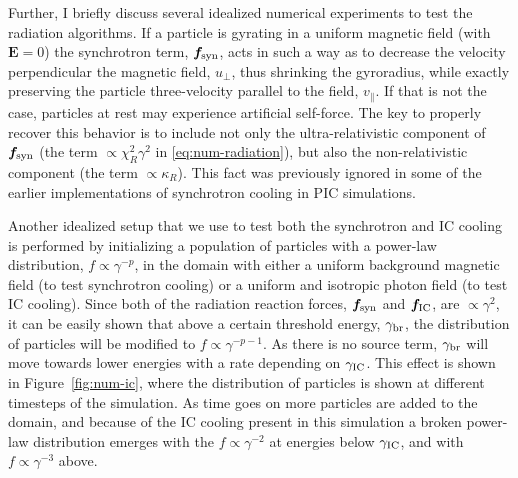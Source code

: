 Further, I briefly discuss several idealized numerical experiments to test the radiation algorithms. If a particle is gyrating in a uniform magnetic field (with $\bm{E}=0$) the synchrotron term, $\bm{f}_{\rm syn}$, acts in such a way as to decrease the velocity perpendicular the magnetic field, $u_\perp$, thus shrinking the gyroradius, while exactly preserving the particle three-velocity parallel to the field, $v_\parallel$. If that is not the case, particles at rest may experience artificial self-force. The key to properly recover this behavior is to include not only the ultra-relativistic component of $\bm{f}_{\rm syn}$ (the term $\propto \chi_R^2\gamma^2$ in \eqref{eq:num-radiation}), but also the non-relativistic component (the term $\propto \kappa_R$). This fact was previously ignored in some of the earlier implementations of synchrotron cooling in PIC simulations. 

Another idealized setup that we use to test both the synchrotron and IC cooling is performed by initializing a population of particles with a power-law distribution, $f\propto \gamma^{-p}$, in the domain with either a uniform background magnetic field (to test synchrotron cooling) or a uniform and isotropic photon field (to test IC cooling). Since both of the radiation reaction forces, $\bm{f}_{\rm syn}$ and $\bm{f}_{\rm IC}$, are $\propto \gamma^2$, it can be easily shown \citep[see, e.g.,][]{1979rpa..book.....R} that above a certain threshold energy, $\gamma_{\rm br}$, the distribution of particles will be modified to $f\propto \gamma^{-p-1}$. As there is no source term, $\gamma_{\rm br}$ will move towards lower energies with a rate depending on $\gamma_{\rm IC}$. This effect is shown in Figure~\ref{fig:num-ic}, where the distribution of particles is shown at different timesteps of the simulation. As time goes on more particles are added to the domain, and because of the IC cooling present in this simulation a broken power-law distribution emerges with the $f\propto \gamma^{-2}$ at energies below $\gamma_{\rm IC}$, and with $f\propto \gamma^{-3}$ above.

